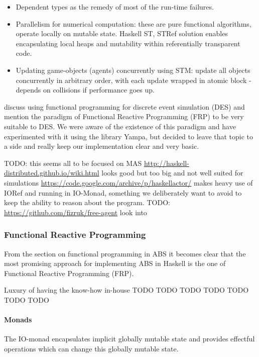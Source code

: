 \begin{itemize}
\item Dependent types as the remedy of most of the run-time failures.
\item Parallelism for numerical computation: these are pure functional algorithms, operate locally on mutable state. Haskell ST, STRef solution enables encapsulating local heaps and mutability within referentially transparent code.
\item Updating game-objects (agents) concurrently using STM: update all objects concurrently in arbitrary order, with each update wrapped in atomic block - depends on collisions if performance goes up.
\end{itemize}

\cite{jankovic_functional_2007} discuss using functional programming for discrete event simulation (DES) and mention the paradigm of Functional Reactive Programming (FRP) to be very suitable to DES. We were aware of the existence of this paradigm and have experimented with it using the library Yampa, but decided to leave that topic to a side and really keep our implementation clear and very basic.

TODO: this seems all to be focused on MAS
\url{http://haskell-distributed.github.io/wiki.html} looks good but too big and not well suited for simulations
\url{https://code.google.com/archive/p/haskellactor/} makes heavy use of IORef and running in IO-Monad, something we deliberately want to avoid to keep the ability to reason about the program.
TODO: \url{https://github.com/fizruk/free-agent} look into

\subsubsection{Functional Reactive Programming}
From the section on functional programming in ABS it becomes clear that the most promising approach for implementing ABS in Haskell is the one of Functional Reactive Programming (FRP). 

Luxury of having the know-how in-house
TODO \cite{courtney_yampa_2003}
TODO \cite{nilsson_functional_2002}
TODO \cite{hudak_arrows_2003}
TODO \cite{mun_hon_functional_2005}
TODO \cite{meisinger_game-engine-architektur_2010}
TODO \cite{nilsson_declarative_2014}
TODO \cite{perez_functional_2016}

\paragraph{Monads}
The IO-monad encapsulates implicit globally mutable state and provides effectful operations which can change this globally mutable state. 

